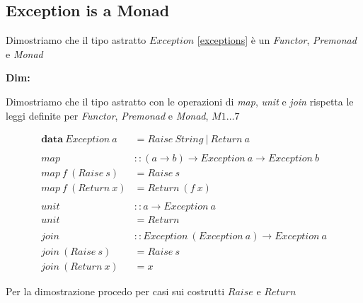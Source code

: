 \label{proofs}

\subsection{Exception is a Monad}
\label{exception_is_a_monad}
Dimostriamo che il tipo astratto $Exception$ \ref{exceptions} è un
\textit{Functor}, \textit{Premonad} e \textit{Monad}\newline

\textbf{Dim:}\newline

Dimostriamo che il tipo astratto con le operazioni di \textit{map},
\textit{unit} e \textit{join} rispetta le leggi definite per \textit{Functor},
\textit{Premonad} e \textit{Monad}, $M1\dots7$

\begin{align*}
  \textbf{data}\ Exception\ a &= Raise\ String\ |\ Return\ a \\\\
  map &:: (a \to b) \to Exception\ a \to Exception\ b\\
  map\ f\ (Raise\ s) &= Raise\ s\\
  map\ f\ (Return\ x) &= Return\ (f\ x)\\\\
  unit &:: a \to Exception\ a\\
  unit &= Return\\\\
  join &:: Exception\ (Exception\ a) \to Exception\ a\\
  join\ (Raise\ s) &= Raise\ s\\
  join\ (Return\ x) &= x
\end{align*}

Per la dimostrazione procedo per casi sui costrutti $Raise$ e $Return$

